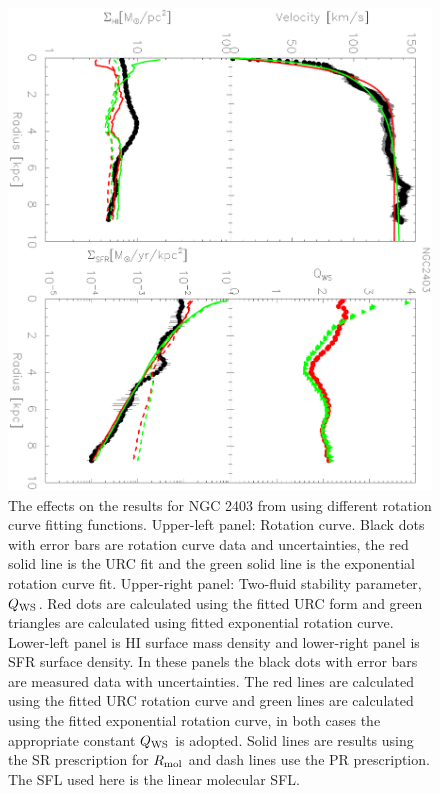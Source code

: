 \documentclass[12pt,preprint]{aastex}
\begin{document}
\begin{figure}
\begin{center}
\includegraphics[scale=0.7,angle=90]{NGC2403_exp.eps} \caption{The effects on the results for NGC 2403 from using different rotation curve fitting functions.
Upper-left panel: Rotation curve. Black dots with error bars are rotation curve data and uncertainties, the red solid line is the URC fit and the green solid line is the exponential rotation curve fit. 
Upper-right panel: Two-fluid stability parameter, $Q_{\rm WS}$. Red dots are calculated using the fitted URC form and green triangles are calculated using fitted exponential rotation curve.
Lower-left panel is HI surface mass density and lower-right panel is SFR surface density.  In these panels the black dots with error bars are measured data with uncertainties.  The red lines are calculated using the fitted URC rotation curve and green lines are calculated using the fitted exponential rotation curve, in both cases the appropriate constant $Q_{\rm WS}$ is adopted.  Solid lines are results using the SR  prescription for $R_{\rm mol}$ and dash lines use the PR  prescription. The SFL used here is the linear molecular SFL.}
\label{NGC2403_exp}
\end{center}
\end{figure}
\end{document}
